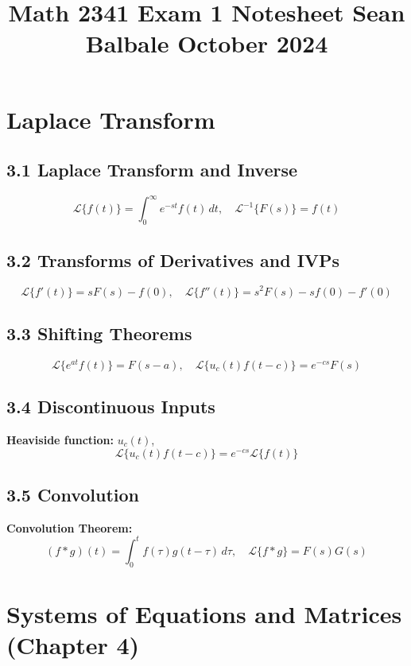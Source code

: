 \documentclass[10pt]{article}
\title{\raggedright \large Math 2341 Exam 1 Notesheet \hfill Sean Balbale \hfill October 2024 \vspace{-3em}}
\date{}
\begin{document}
\maketitle
\begin{multicols}{2}

  \section*{Laplace Transform}
  \subsection*{3.1 Laplace Transform and Inverse}
  \[
    \mathcal{L}\{f(t)\} = \int_0^\infty e^{-st}f(t) \, dt, \quad \mathcal{L}^{-1}\{F(s)\} = f(t)
  \]

  \subsection*{3.2 Transforms of Derivatives and IVPs}
  \[
    \mathcal{L}\{f'(t)\} = sF(s) - f(0), \quad \mathcal{L}\{f''(t)\} = s^2F(s) - sf(0) - f'(0)
  \]

  \subsection*{3.3 Shifting Theorems}
  \[
    \mathcal{L}\{e^{at}f(t)\} = F(s-a), \quad \mathcal{L}\{u_c(t)f(t-c)\} = e^{-cs}F(s)
  \]

  \subsection*{3.4 Discontinuous Inputs}
  \textbf{Heaviside function:} \( u_c(t) \), \\
  \[
    \mathcal{L}\{u_c(t)f(t-c)\} = e^{-cs}\mathcal{L}\{f(t)\}
  \]

  \subsection*{3.5 Convolution}
  \textbf{Convolution Theorem:}
  \[
    (f * g)(t) = \int_0^t f(\tau)g(t-\tau) \, d\tau, \quad \mathcal{L}\{f * g\} = F(s)G(s)
  \]

  \section*{Systems of Equations and Matrices (Chapter 4)}

\end{multicols}
\end{document}
